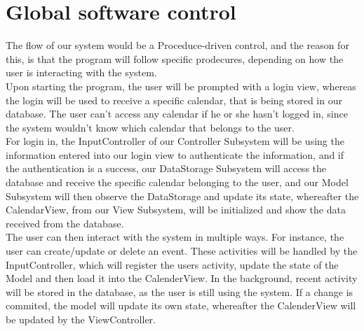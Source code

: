 \section{Global software control}
The flow of our system would be a Proceduce-driven control, and the reason for this, is that the program will follow specific prodecures, depending on how the user is interacting with the system.\\

Upon starting the program, the user will be prompted with a login view, whereas the login will be used to receive a specific calendar, that is being stored in our database. The user can't access any calendar if he or she hasn't logged in, since the system wouldn't know which calendar that belongs to the user.\\

For login in, the InputController of our Controller Subsystem will be using the information entered into our login view to authenticate the information, and if the authentication is a success, our DataStorage Subsystem will access the database and receive the specific calendar belonging to the user, and our Model Subsystem will then observe the DataStorage and update its state, whereafter the CalendarView, from our View Subsystem, will be initialized and show the data received from the database.\\

The user can then interact with the system in multiple ways. For instance, the user can create/update or delete an event. These activities will be handled by the InputController, which will register the users activity, update the state of the Model and then load it into the CalenderView. In the background, recent activity will be stored in the database, as the user is still using the system. If a change is commited, the model will update its own state, whereafter the CalenderView will be updated by the ViewController.\\